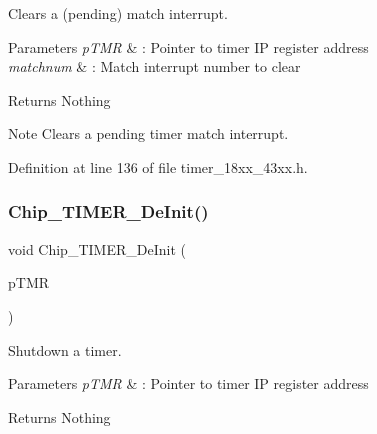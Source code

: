 Clears a (pending) match interrupt. 


\begin{DoxyParams}{Parameters}
{\em p\+T\+MR} & \+: Pointer to timer IP register address \\
\hline
{\em matchnum} & \+: Match interrupt number to clear \\
\hline
\end{DoxyParams}
\begin{DoxyReturn}{Returns}
Nothing 
\end{DoxyReturn}
\begin{DoxyNote}{Note}
Clears a pending timer match interrupt. 
\end{DoxyNote}


Definition at line 136 of file timer\+\_\+18xx\+\_\+43xx.\+h.

\mbox{\label{group___t_i_m_e_r__18_x_x__43_x_x_gaa52f3e33303d7d4f1e2325586a21a5c0}} 
\subsubsection{\texorpdfstring{Chip\+\_\+\+T\+I\+M\+E\+R\+\_\+\+De\+Init()}{Chip\_TIMER\_DeInit()}}
{\footnotesize\ttfamily void Chip\+\_\+\+T\+I\+M\+E\+R\+\_\+\+De\+Init (\begin{DoxyParamCaption}\item[{\hyperlink{struct_l_p_c___t_i_m_e_r___t}{L\+P\+C\+\_\+\+T\+I\+M\+E\+R\+\_\+T} $\ast$}]{p\+T\+MR }\end{DoxyParamCaption})}



Shutdown a timer. 


\begin{DoxyParams}{Parameters}
{\em p\+T\+MR} & \+: Pointer to timer IP register address \\
\hline
\end{DoxyParams}
\begin{DoxyReturn}{Returns}
Nothing 
\end{DoxyReturn}


